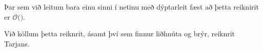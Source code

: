 {
}

{
	{
		\item<1-> Þar sem við leitum bara einu sinni í netinu með dýptarleit fæst að þetta reiknirit er $\mathcal{O}($\onslide<2->{$E + V$}$)$.
		\item<3-> Við köllum þetta reiknrit, ásamt því sem finnur liðhnúta og brýr, reiknrit Tarjans.
	}
}




{
}


